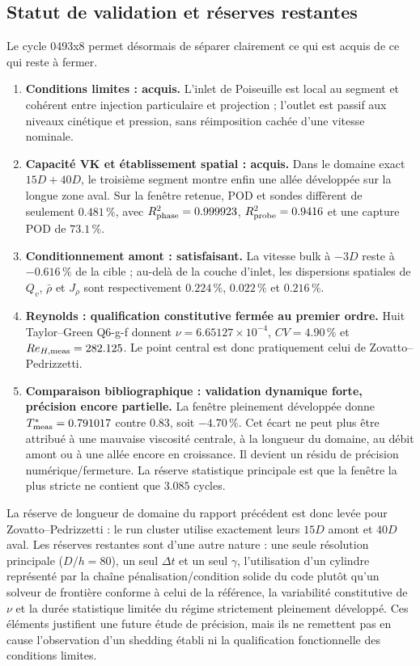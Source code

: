 \documentclass[11pt,a4paper]{article}
\begin{document}
\subsection{Statut de validation et réserves restantes}

Le cycle 0493x8 permet désormais de séparer clairement ce qui est acquis de ce qui reste à fermer.
\begin{enumerate}[leftmargin=2em]
  \item \textbf{Conditions limites : acquis.} L'inlet de Poiseuille est local au segment et cohérent entre injection particulaire et projection ; l'outlet est passif aux niveaux cinétique et pression, sans réimposition cachée d'une vitesse nominale.
  \item \textbf{Capacité VK et établissement spatial : acquis.} Dans le domaine exact $15D+40D$, le troisième segment montre enfin une allée développée sur la longue zone aval. Sur la fenêtre retenue, POD et sondes diffèrent de seulement $0.481\,\%$, avec $R^2_{\rm phase}=0.999923$, $R^2_{\rm probe}=0.9416$ et une capture POD de $73.1\,\%$.
  \item \textbf{Conditionnement amont : satisfaisant.} La vitesse bulk à $-3D$ reste à $-0.616\,\%$ de la cible ; au-delà de la couche d'inlet, les dispersions spatiales de $Q_v$, $\bar\rho$ et $J_\rho$ sont respectivement $0.224\,\%$, $0.022\,\%$ et $0.216\,\%$.
  \item \textbf{Reynolds : qualification constitutive fermée au premier ordre.} Huit Taylor--Green Q6-g-f donnent $\nu=6.65127\times10^{-4}$, $CV=4.90\,\%$ et $Re_{H,\rm meas}=282.125$. Le point central est donc pratiquement celui de Zovatto--Pedrizzetti.
  \item \textbf{Comparaison bibliographique : validation dynamique forte, précision encore partielle.} La fenêtre pleinement développée donne $T^*_{\rm meas}=0.791017$ contre $0.83$, soit $-4.70\,\%$. Cet écart ne peut plus être attribué à une mauvaise viscosité centrale, à la longueur du domaine, au débit amont ou à une allée encore en croissance. Il devient un résidu de précision numérique/fermeture. La réserve statistique principale est que la fenêtre la plus stricte ne contient que $3.085$ cycles.
\end{enumerate}

La réserve de longueur de domaine du rapport précédent est donc levée pour Zovatto--Pedrizzetti : le run cluster utilise exactement leurs $15D$ amont et $40D$ aval. Les réserves restantes sont d'une autre nature : une seule résolution principale ($D/h=80$), un seul $\Delta t$ et un seul $\gamma$, l'utilisation d'un cylindre représenté par la chaîne pénalisation/condition solide du code plutôt qu'un solveur de frontière conforme à celui de la référence, la variabilité constitutive de $\nu$ et la durée statistique limitée du régime strictement pleinement développé. Ces éléments justifient une future étude de précision, mais ils ne remettent pas en cause l'observation d'un shedding établi ni la qualification fonctionnelle des conditions limites.
\end{document}
